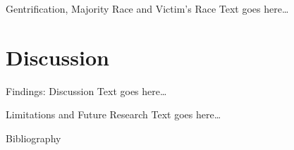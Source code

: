 \documentclass{beamer}
\begin{document}
\begin{frame}{Gentrification, Majority Race and Victim’s Race}
	Text goes here\ldots
\end{frame}

\section{Discussion}
\begin{frame}{Findings: Discussion}
	Text goes here\ldots
\end{frame}

\begin{frame}{Limitations and Future Research}
	Text goes here\ldots
\end{frame}


\sloppy
\begin{frame}{Bibliography}
	\printbibliography
\end{frame}

\end{document}
